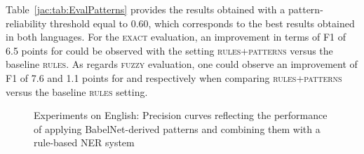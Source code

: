 \documentclass[output=paper]{langsci/langscibook}
\begin{document}
Table~\ref{jac:tab:EvalPatterns} provides the results obtained with a pattern-reliability threshold equal to 0.60, which corresponds to the best results obtained in both languages. For the \textsc{exact} evaluation, an improvement in terms of F1 of 6.5 points for  could be observed with the setting \textsc{rules+patterns} versus the baseline \textsc{rules}. As regards \textsc{fuzzy} evaluation, one could observe an improvement of F1 of 7.6 and 1.1 points for  and  respectively when comparing \textsc{rules+patterns} versus the baseline \textsc{rules} setting.

\begin{figure}[p]
\caption{Experiments on English: Precision curves reflecting the performance of applying BabelNet-derived patterns and combining them with a rule-based NER system}
\label{jac:fig:eval_patterns_english_precision}
\end{figure}
\end{document}
